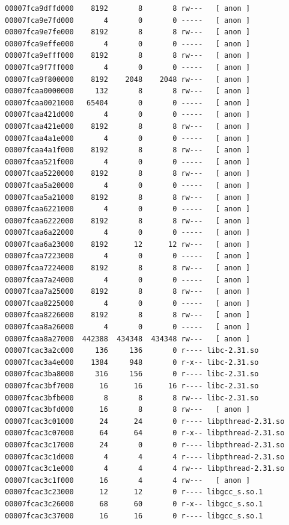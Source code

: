 \documentclass[11pt, a4paper]{article}
\begin{document}
\begin{Verbatim}[fontsize=\small]
00007fca9dffd000    8192       8       8 rw---   [ anon ]
00007fca9e7fd000       4       0       0 -----   [ anon ]
00007fca9e7fe000    8192       8       8 rw---   [ anon ]
00007fca9effe000       4       0       0 -----   [ anon ]
00007fca9efff000    8192       8       8 rw---   [ anon ]
00007fca9f7ff000       4       0       0 -----   [ anon ]
00007fca9f800000    8192    2048    2048 rw---   [ anon ]
00007fcaa0000000     132       8       8 rw---   [ anon ]
00007fcaa0021000   65404       0       0 -----   [ anon ]
00007fcaa421d000       4       0       0 -----   [ anon ]
00007fcaa421e000    8192       8       8 rw---   [ anon ]
00007fcaa4a1e000       4       0       0 -----   [ anon ]
00007fcaa4a1f000    8192       8       8 rw---   [ anon ]
00007fcaa521f000       4       0       0 -----   [ anon ]
00007fcaa5220000    8192       8       8 rw---   [ anon ]
00007fcaa5a20000       4       0       0 -----   [ anon ]
00007fcaa5a21000    8192       8       8 rw---   [ anon ]
00007fcaa6221000       4       0       0 -----   [ anon ]
00007fcaa6222000    8192       8       8 rw---   [ anon ]
00007fcaa6a22000       4       0       0 -----   [ anon ]
00007fcaa6a23000    8192      12      12 rw---   [ anon ]
00007fcaa7223000       4       0       0 -----   [ anon ]
00007fcaa7224000    8192       8       8 rw---   [ anon ]
00007fcaa7a24000       4       0       0 -----   [ anon ]
00007fcaa7a25000    8192       8       8 rw---   [ anon ]
00007fcaa8225000       4       0       0 -----   [ anon ]
00007fcaa8226000    8192       8       8 rw---   [ anon ]
00007fcaa8a26000       4       0       0 -----   [ anon ]
00007fcaa8a27000  442388  434348  434348 rw---   [ anon ]
00007fcac3a2c000     136     136       0 r---- libc-2.31.so
00007fcac3a4e000    1384     948       0 r-x-- libc-2.31.so
00007fcac3ba8000     316     156       0 r---- libc-2.31.so
00007fcac3bf7000      16      16      16 r---- libc-2.31.so
00007fcac3bfb000       8       8       8 rw--- libc-2.31.so
00007fcac3bfd000      16       8       8 rw---   [ anon ]
00007fcac3c01000      24      24       0 r---- libpthread-2.31.so
00007fcac3c07000      64      64       0 r-x-- libpthread-2.31.so
00007fcac3c17000      24       0       0 r---- libpthread-2.31.so
00007fcac3c1d000       4       4       4 r---- libpthread-2.31.so
00007fcac3c1e000       4       4       4 rw--- libpthread-2.31.so
00007fcac3c1f000      16       4       4 rw---   [ anon ]
00007fcac3c23000      12      12       0 r---- libgcc_s.so.1
00007fcac3c26000      68      60       0 r-x-- libgcc_s.so.1
00007fcac3c37000      16      16       0 r---- libgcc_s.so.1

\end{Verbatim}
\end{document}
